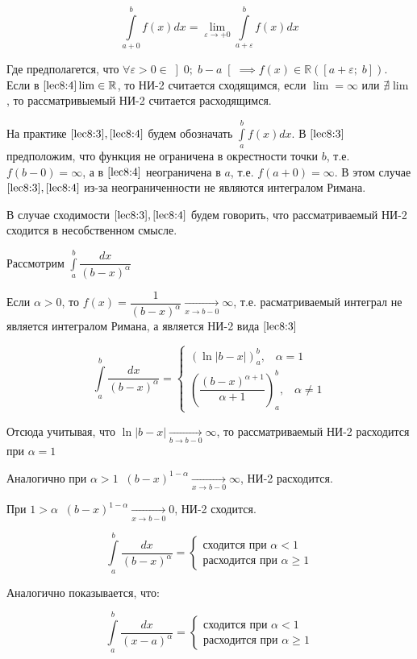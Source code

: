 \documentclass[../../main.tex]{subfiles}
\begin{document}
\begin{equation} \label{lec8:4}
 \int\limits_{a + 0}^{b}f(x)dx = \underset{\varepsilon \to +0}\lim \int\limits_{a + \varepsilon}^{b}f(x)dx
\end{equation}

Где предполагется, что $\forall \varepsilon > 0 \in \left]0;\; b - a\right[ \implies f(x) \in \mathbb{R}(\left[a + \varepsilon;\; b\right])$. Если в $\eqref{lec8:4} \lim \in \mathbb{R}$, то НИ-2 считается сходящимся, если $\lim = \infty$ или $\nexists \lim$, то рассматривыемый НИ-2 считается расходящимся.

На практике $\eqref{lec8:3}, \eqref{lec8:4}$ будем обозначать $\displaystyle\int\limits_{a}^{b}f(x)dx$. В $\eqref{lec8:3}$ предположим, что функция не ограничена в окрестности точки $b$, т.е. $f(b - 0) = \infty$, а в $\eqref{lec8:4}$ неограничена в $a$, т.е. $f(a + 0) = \infty$. В этом случае $\eqref{lec8:3}, \eqref{lec8:4}$ из-за неограниченности не являются интегралом Римана.

В случае сходимости $\eqref{lec8:3}, \eqref{lec8:4}$ будем говорить, что рассматриваемый НИ-2 сходится в несобственном смысле.

\begin{exmp}
 Рассмотрим $\displaystyle\int\limits_{a}^{b}\dfrac{dx}{(b - x)^{\alpha}}$
 
 Если $\alpha > 0$, то $f(x) = \dfrac{1}{(b -x)^{\alpha}} \xrightarrow[x \to b - 0]{} \infty$, т.е. расматриваемый интеграл не является интегралом Римана, а является НИ-2 вида $\eqref{lec8:3}$
 
 \[\int\limits_{a}^{b}\dfrac{dx}{(b - x)^{\alpha}} =
 \begin{cases}
 \left(\ln|b - x|\right)_{a}^{b},\;\;\; \alpha = 1\\
 \left(\dfrac{(b - x)^{\alpha + 1}}{\alpha + 1}\right)_{a}^{b},\;\;\; \alpha \neq 1                                               
\end{cases}\]

Отсюда учитывая, что $\ln|b - x| \xrightarrow[b \to b - 0]{} \infty$, то рассматриваемый НИ-2 расходится при $\alpha = 1$

Аналогично при $\alpha > 1 \;\;(b - x)^{1- \alpha} \xrightarrow[x \to b - 0]{} \infty$, НИ-2 расходится.

При $1 > \alpha \;\; (b - x)^{1 - \alpha} \xrightarrow[x \to b - 0]{} 0$, НИ-2 сходится.

\[\int\limits_{a}^{b} \dfrac{dx}{(b - x)^{\alpha}} = 
\begin{cases}
\text{сходится при } \alpha < 1\\
\text{расходится при } \alpha \geq 1
\end{cases}\]

Аналогично показывается, что:

\[\int\limits_{a}^{b} \dfrac{dx}{(x - a)^{\alpha}} = 
\begin{cases}
\text{сходится при } \alpha < 1\\
\text{расходится при } \alpha \geq 1
\end{cases}\]
\end{exmp}
\end{document}
